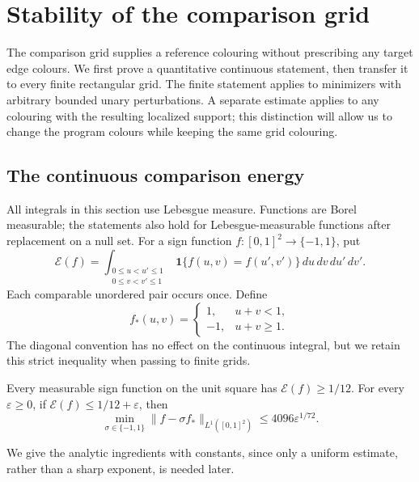 \section{Stability of the comparison grid}
\label{sec:stability}

The comparison grid supplies a reference colouring without prescribing any
target edge colours.  We first prove a quantitative continuous statement,
then transfer it to every finite rectangular grid.  The finite statement
applies to minimizers with arbitrary bounded unary perturbations.
A separate estimate applies to any colouring with the resulting localized
support; this distinction will allow us to change the program colours while
keeping the same grid colouring.

\subsection{The continuous comparison energy}

All integrals in this section use Lebesgue measure.  Functions are Borel
measurable; the statements also hold for Lebesgue-measurable functions after
replacement on a null set.  For a sign function
$f:[0,1]^2\to\{-1,1\}$, put
\begin{equation}
 \mathcal E(f)=
 \int_{\substack{0\le u<u'\le1\\0\le v<v'\le1}}
 \mathbf 1\{f(u,v)=f(u',v')\}\,du\,dv\,du'\,dv'.
 \label{eq:comparison-energy}
\end{equation}
Each comparable unordered pair occurs once.  Define
\[
 f_*(u,v)=
 \begin{cases}1,&u+v<1,\\-1,&u+v\ge1.\end{cases}
\]
The diagonal convention has no effect on the continuous integral, but we
retain this strict inequality when passing to finite grids.

\begin{theorem}
\label{thm:continuous}
Every measurable sign function on the unit square has
$\mathcal E(f)\ge1/12$.  For every $\varepsilon\ge0$, if
$\mathcal E(f)\le1/12+\varepsilon$, then
\begin{equation}
 \min_{\sigma\in\{-1,1\}}
 \|f-\sigma f_*\|_{L^1([0,1]^2)}
 \le4096\varepsilon^{1/72}.
 \label{eq:continuous-stability}
\end{equation}
\end{theorem}

We give the analytic ingredients with constants, since only a uniform
estimate, rather than a sharp exponent, is needed later.

